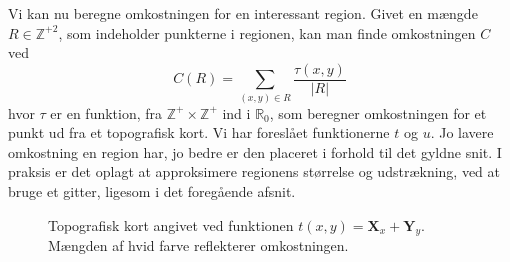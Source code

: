 {Vi kan nu beregne omkostningen for en interessant region. Givet en
mængde $R \in \mathbb{Z}^{+2}$, som indeholder punkterne i regionen, kan
man finde omkostningen $C$ ved
\begin{equation}
    C(R) = \sum_{(x, y) \in R}{\frac{\tau(x, y)}{|R|}}
\end{equation}
hvor $\tau$ er en funktion, fra $\mathbb{Z}^{+}\times\mathbb{Z}^{+}$ ind
i $\mathbb{R}_0$, som beregner omkostningen for et punkt ud fra et
topografisk kort. Vi har foreslået funktionerne $t$ og $u$. Jo lavere
omkostning en region har, jo bedre er den placeret i forhold til det
gyldne snit. I praksis er det oplagt at approksimere regionens størrelse
og udstrækning, ved at bruge et gitter, ligesom i det foregående afsnit.

\begin{figure}[h]
    \setlength\fboxsep{0pt}
    \setlength\fboxrule{0.5pt}
    \begin{center}
    \end{center}
    \caption[]{Topografisk kort angivet ved funktionen $t(x, y) =
    \mathbf{X}_x + \mathbf{Y}_y$. Mængden af hvid farve reflekterer
    omkostningen.}
    \label{topography_plus}
\end{figure}

}
